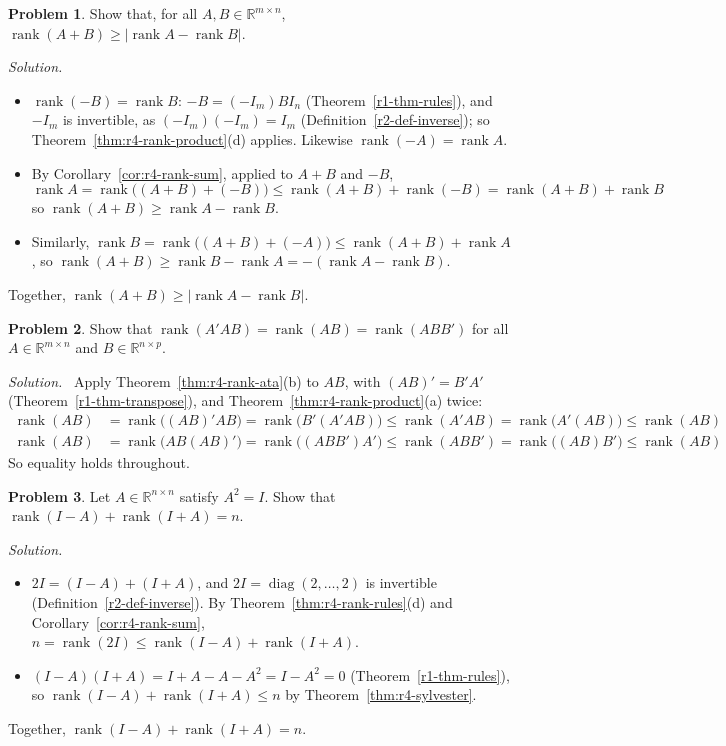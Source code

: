 \documentclass[12pt]{article}
\newcommand{\R}{\mathbb R}
\DeclareMathOperator{\diag}{diag}
\DeclareMathOperator{\rank}{rank}
\theoremstyle{definition}
\newtheorem{problem}{Problem}
\newenvironment{solution}{\par\noindent\textit{Solution.}\ }{\par\smallskip}
\begin{document}
\begin{problem}\label{r4-pr-rank-difference}
Show that, for all \(A,B\in\R^{m\times n}\), \(\rank(A+B)\geqslant\lvert\rank A-\rank B\rvert\).
\end{problem}
\begin{solution}
\begin{itemize}
\item \(\rank(-B)=\rank B\): \(-B=(-I_m)BI_n\) (Theorem~\ref{r1-thm-rules}), and \(-I_m\) is invertible, as
\((-I_m)(-I_m)=I_m\) (Definition~\ref{r2-def-inverse}); so Theorem~\ref{thm:r4-rank-product}(d) applies. Likewise
\(\rank(-A)=\rank A\).
\item By Corollary~\ref{cor:r4-rank-sum}, applied to \(A+B\) and \(-B\),
\[
\rank A=\rank\bigl((A+B)+(-B)\bigr)\leqslant\rank(A+B)+\rank(-B)=\rank(A+B)+\rank B
\]
so \(\rank(A+B)\geqslant\rank A-\rank B\).
\item Similarly, \(\rank B=\rank\bigl((A+B)+(-A)\bigr)\leqslant\rank(A+B)+\rank A\), so
\(\rank(A+B)\geqslant\rank B-\rank A=-(\rank A-\rank B)\).
\end{itemize}
Together, \(\rank(A+B)\geqslant\lvert\rank A-\rank B\rvert\).
\end{solution}

\begin{problem}\label{ex:r4-rank-atab}
Show that \(\rank(A'AB)=\rank(AB)=\rank(ABB')\) for all \(A\in\R^{m\times n}\) and
\(B\in\R^{n\times p}\).
\end{problem}
\begin{solution}
Apply Theorem~\ref{thm:r4-rank-ata}(b) to \(AB\), with \((AB)'=B'A'\) (Theorem~\ref{r1-thm-transpose}),
and Theorem~\ref{thm:r4-rank-product}(a) twice:
\[
\begin{aligned}
\rank(AB)&=\rank\bigl((AB)'AB\bigr)=\rank\bigl(B'(A'AB)\bigr)\leqslant\rank(A'AB)
=\rank\bigl(A'(AB)\bigr)\leqslant\rank(AB)\\
\rank(AB)&=\rank\bigl(AB(AB)'\bigr)=\rank\bigl((ABB')A'\bigr)\leqslant\rank(ABB')
=\rank\bigl((AB)B'\bigr)\leqslant\rank(AB)
\end{aligned}
\]
So equality holds throughout.
\end{solution}

\begin{problem}\label{ex:r4-involutory-rank}
Let \(A\in\R^{n\times n}\) satisfy \(A^2=I\). Show that \(\rank(I-A)+\rank(I+A)=n\).
\end{problem}
\begin{solution}
\begin{itemize}
\item \(2I=(I-A)+(I+A)\), and \(2I=\diag(2,\dots,2)\) is invertible (Definition~\ref{r2-def-inverse}). By
Theorem~\ref{thm:r4-rank-rules}(d) and Corollary~\ref{cor:r4-rank-sum},
\(n=\rank(2I)\leqslant\rank(I-A)+\rank(I+A)\).
\item \((I-A)(I+A)=I+A-A-A^2=I-A^2=0\) (Theorem~\ref{r1-thm-rules}), so
\(\rank(I-A)+\rank(I+A)\leqslant n\) by Theorem~\ref{thm:r4-sylvester}.
\end{itemize}
Together, \(\rank(I-A)+\rank(I+A)=n\).
\end{solution}
\end{document}
